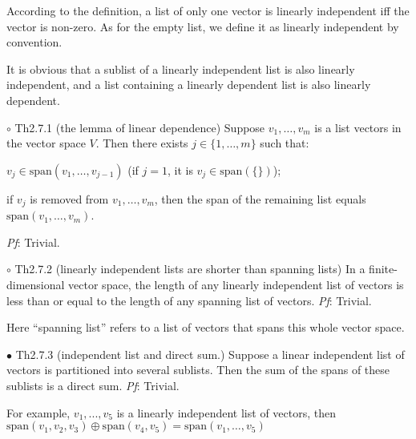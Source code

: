 \documentclass{article}
\begin{document}
\begin{Rmk}{}
    \begin{compactenum}
        \item According to the definition, a list of only one vector is linearly independent iff the vector is non-zero. As for the empty list, we define it as linearly independent by convention.
        \item \textcolor{Th}{It is obvious that a sublist of a linearly independent list is also linearly independent, and a list containing a linearly dependent list is also linearly dependent.}
    \end{compactenum}
\end{Rmk}

\begin{Th}{$\circ$ Th2.7.1 (the lemma of linear dependence)}
    Suppose $v_1, \dots, v_m$ is a list vectors in the vector space $V$. Then there exists $j\in\{1,\dots, m\}$ such that:
    \begin{compactenum}
        \item $v_j\in \text{span}(v_1, \dots, v_{j-1})$ (if $j=1$, it is $v_j\in\text{span}(\{\})$);
        \item if $v_j$ is removed from $v_1, \dots, v_m$, then the span of the remaining list equals $\text{span}(v_1, \dots, v_m)$. 
    \end{compactenum}
    \tcblower
    \textit{Pf}: Trivial.
\end{Th}

\begin{Th}{$\circ$ Th2.7.2 (linearly independent lists are shorter than spanning lists)}
    In a finite-dimensional vector space, the length of any linearly independent list of vectors is less than or equal to the length of any spanning list of vectors.
    \tcblower
    \textit{Pf}: Trivial.
\end{Th}

\begin{Rmk}{}
    Here ``spanning list'' refers to a list of vectors that spans this whole vector space.
\end{Rmk}

\begin{Th}{$\bullet$ Th2.7.3 (independent list and direct sum.)}
    Suppose a linear independent list of vectors is partitioned into several sublists. Then the sum of the spans of these sublists is a direct sum.
    \tcblower
    \textit{Pf}: Trivial.
\end{Th}

\begin{Rmk}{}
    For example, $v_1, ..., v_5$ is a linearly independent list of vectors, then $\text{span}(v_1, v_2, v_3)\oplus\text{span}(v_4, v_5) = \text{span}(v_1, \dots, v_5)$
\end{Rmk}
\end{document}

